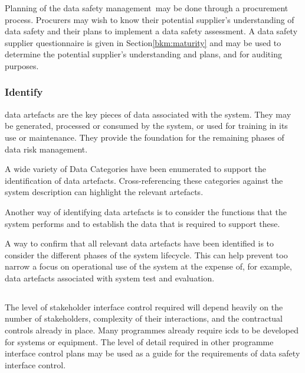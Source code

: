 Planning of the \cbstart data safety management\cbend\ may be done through a procurement process. Procurers may wish to know their potential supplier's understanding of data safety and their plans to implement a \gls{data safety assessment}. A data safety supplier questionnaire is given in Section\ref{bkm:maturity} and may be used to determine the potential supplier's understanding and plans, and for auditing purposes.

\subsubsection{Identify }
\Glspl{data artefact} are the key pieces of data associated with the system. They may be generated, processed or consumed by the system, or used for training in its use or maintenance. They provide the foundation for the remaining phases of data risk management.

A wide variety of Data Categories have been enumerated to support the identification of \glspl{data artefact}. Cross-referencing these categories against the system description can highlight the relevant artefacts. 

Another way of identifying \glspl{data artefact} is to consider the functions that the system performs and to establish the data that is required to support these.

A way to confirm that all relevant \glspl{data artefact} have been identified is to consider the different phases of the system lifecycle. This can help prevent too narrow a focus on operational use of the system at the expense of, for example, \glspl{data artefact} associated with system test and evaluation.

\subsection{}
The level of
\gls{stakeholder}
interface control required will depend heavily on the number of \glspl{stakeholder}, complexity of their interactions, and the contractual controls already in place. Many programmes already require \glspl{icd} to be developed for systems or equipment. The level of detail required in other programme interface control plans may be used as a guide for the requirements of data safety interface control. 


